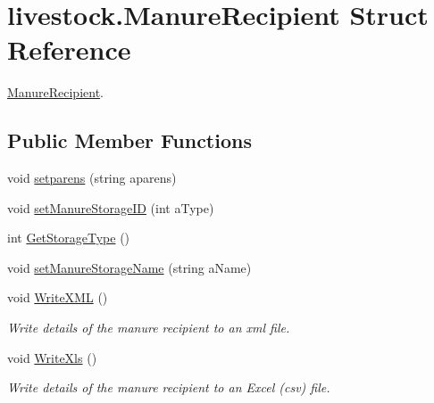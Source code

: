 \hypertarget{structlivestock_1_1_manure_recipient}{}\section{livestock.\+Manure\+Recipient Struct Reference}
\label{structlivestock_1_1_manure_recipient}


\mbox{\hyperlink{structlivestock_1_1_manure_recipient}{Manure\+Recipient}}.  


\subsection*{Public Member Functions}
\begin{DoxyCompactItemize}
\item 
void \mbox{\hyperlink{structlivestock_1_1_manure_recipient_a1a0d58eb3ea8b605c54689dfeff011d8}{setparens}} (string aparens)
\item 
void \mbox{\hyperlink{structlivestock_1_1_manure_recipient_ad0d4cbec67fa194f399bb833d2cbc245}{set\+Manure\+Storage\+ID}} (int a\+Type)
\item 
int \mbox{\hyperlink{structlivestock_1_1_manure_recipient_a0c22336e1afb2d95c77579e6058c3eb4}{Get\+Storage\+Type}} ()
\item 
void \mbox{\hyperlink{structlivestock_1_1_manure_recipient_a6ed29ef9379457b3add6d3c2e9d6bf62}{set\+Manure\+Storage\+Name}} (string a\+Name)
\item 
void \mbox{\hyperlink{structlivestock_1_1_manure_recipient_ab93d856ae7ab6bc3eb1911d7fc3e6167}{Write\+X\+ML}} ()
\begin{DoxyCompactList}\small\item\em Write details of the manure recipient to an xml file. \end{DoxyCompactList}\item 
void \mbox{\hyperlink{structlivestock_1_1_manure_recipient_a315089a601963280da32e84aca9bfb7c}{Write\+Xls}} ()
\begin{DoxyCompactList}\small\item\em Write details of the manure recipient to an Excel (csv) file. \end{DoxyCompactList}\end{DoxyCompactItemize}
